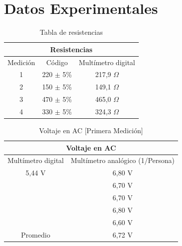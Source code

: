 \documentclass[letterpaper, 12pt]{report}
\begin{document}
\section{Datos Experimentales}

\begin{table}[h]
	\begin{center}
		\begin{tabular}{|c|c|c|}
			\multicolumn{3}{c}{Resistencias}              \\ \hline
			Medición & Código        & Multímetro digital \\ \hline
			1        & 220 $\pm$ 5\% & 217,9 $\Omega$     \\ \hline
			2        & 150 $\pm$ 5\% & 149,1 $\Omega$     \\ \hline
			3        & 470 $\pm$ 5\% & 465,0 $\Omega$     \\ \hline
			4        & 330 $\pm$ 5\% & 324,3 $\Omega$     \\ \hline
		\end{tabular}
		\caption{Tabla de resistencias}
		\label{tab:resistencias}
	\end{center}
\end{table}


\begin{table}[H]
	\begin{center}
		\begin{tabular}{|c|c|}
			\multicolumn{2}{c}{Voltaje en AC}                     \\ \hline
			Multímetro digital & Multímetro analógico (1/Persona) \\ \hline
			5,44 V             & 6,80 V                           \\
			                   & 6,70 V                           \\
			                   & 6,70 V                           \\
			                   & 6,80 V                           \\
			                   & 6,60 V                           \\ \hline
			Promedio           & 6,72 V                           \\ \hline
		\end{tabular}
		\caption{Voltaje en AC [Primera Medición]}
		\label{tab:voltajeAC_1}
	\end{center}
\end{table}
\end{document}
